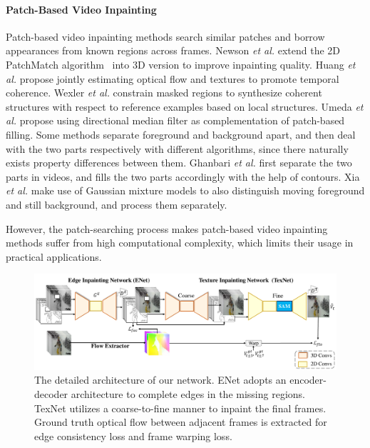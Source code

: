 \paragraph{Patch-Based Video Inpainting} Patch-based video inpainting methods search similar patches and borrow appearances from known regions across frames. 
Newson \emph{et al.} \cite{newson2014video} extend the 2D PatchMatch algorithm~\cite{barnes2009patchmatch} into 3D version to improve inpainting quality.
Huang \emph{et al.} \cite{huang2016temporally} propose jointly estimating optical flow and textures to promote temporal coherence.
Wexler \emph{et al.} \cite{wexler2007space} constrain masked regions to synthesize coherent structures with respect to reference examples based on local structures. 
Umeda \emph{et al.} \cite{umeda2012removal} propose using directional median filter as complementation of patch-based filling.
Some methods separate foreground and background apart, and then deal with the two parts respectively with different algorithms, since there naturally exists property differences between them.  
Ghanbari \emph{et al.} \cite{ghanbari2011contour} first separate the two parts in videos, and fills the two parts accordingly with the help of contours.
Xia \emph{et al.} \cite{xia2011exemplar} make use of Gaussian mixture models to also distinguish moving foreground and still background, and process them separately.   
  
However, the patch-searching process makes patch-based video inpainting methods suffer from high computational complexity, which limits their usage in practical applications.



\begin{figure}[!t]
	\centering
	\includegraphics[width=2.05\columnwidth]{sti} %
	\caption{The detailed architecture of our network. ENet adopts an encoder-decoder architecture to complete edges in the missing regions. TexNet utilizes a coarse-to-fine manner to inpaint the final frames. Ground truth optical flow between adjacent frames is extracted for edge consistency loss and frame warping loss. }
	
	\label{fig:stiNet}
\end{figure}

